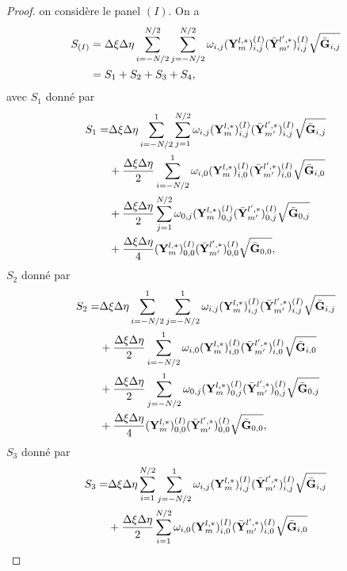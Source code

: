 \begin{proof}
on considère le panel $(I)$. On a
\begin{align*}
S_{(I)} & = \Delta \xi \Delta \eta \displaystyle\sum\limits_{i=-N/2}^{N/2} \displaystyle\sum\limits_{j=-N/2}^{N/2} \omega_{i,j} (\mathbf{Y}_m^{l,*})_{i,j}^{(I)} (\bar{\mathbf{Y}}_{m'}^{l',*})_{i,j}^{(I)} \sqrt{\bar{\mathbf{G}}_{i,j}} \\
	& = S_1 + S_2 + S_3 +S_4,
\end{align*}
avec $S_1$ donné par
\begin{align*}
S_1 = & \Delta \xi \Delta \eta \displaystyle\sum\limits_{i=-N/2}^{1} \displaystyle\sum\limits_{j=1}^{N/2} \omega_{i,j} (\mathbf{Y}_m^{l,*})_{i,j}^{(I)} (\bar{\mathbf{Y}}_{m'}^{l',*})_{i,j}^{(I)} \sqrt{\bar{\mathbf{G}}_{i,j}} \\
	& + \dfrac{\Delta \xi \Delta \eta}{2} \displaystyle\sum\limits_{i=-N/2}^{1} \omega_{i,0} (\mathbf{Y}_m^{l,*})_{i,0}^{(I)} (\bar{\mathbf{Y}}_{m'}^{l',*})_{i,0}^{(I)} \sqrt{\bar{\mathbf{G}}_{i,0}}\\
		& + \dfrac{\Delta \xi \Delta \eta}{2} \displaystyle\sum\limits_{j=1}^{N/2} \omega_{0,j} (\mathbf{Y}_m^{l,*})_{0,j}^{(I)} (\bar{\mathbf{Y}}_{m'}^{l',*})_{0,j}^{(I)} \sqrt{\bar{\mathbf{G}}_{0,j}}\\
		& + \dfrac{\Delta \xi \Delta \eta}{4} (\mathbf{Y}_m^{l,*})_{0,0}^{(I)} (\bar{\mathbf{Y}}_{m'}^{l',*})_{0,0}^{(I)} \sqrt{\bar{\mathbf{G}}_{0,0}},
\end{align*}
$S_2$ donné par
\begin{align*}
S_2 = & \Delta \xi \Delta \eta \displaystyle\sum\limits_{i=-N/2}^{1} \displaystyle\sum\limits_{j=-N/2}^{1} \omega_{i,j} (\mathbf{Y}_m^{l,*})_{i,j}^{(I)} (\bar{\mathbf{Y}}_{m'}^{l',*})_{i,j}^{(I)} \sqrt{\bar{\mathbf{G}}_{i,j}} \\
	& + \dfrac{\Delta \xi \Delta \eta}{2} \displaystyle\sum\limits_{i=-N/2}^{1} \omega_{i,0} (\mathbf{Y}_m^{l,*})_{i,0}^{(I)} (\bar{\mathbf{Y}}_{m'}^{l',*})_{i,0}^{(I)} \sqrt{\bar{\mathbf{G}}_{i,0}}\\
		& + \dfrac{\Delta \xi \Delta \eta}{2} \displaystyle\sum\limits_{j=-N/2}^{1} \omega_{0,j} (\mathbf{Y}_m^{l,*})_{0,j}^{(I)} (\bar{\mathbf{Y}}_{m'}^{l',*})_{0,j}^{(I)} \sqrt{\bar{\mathbf{G}}_{0,j}}\\
		& + \dfrac{\Delta \xi \Delta \eta}{4} (\mathbf{Y}_m^{l,*})_{0,0}^{(I)} (\bar{\mathbf{Y}}_{m'}^{l',*})_{0,0}^{(I)} \sqrt{\bar{\mathbf{G}}_{0,0}},
\end{align*}
$S_3$ donné par
\begin{align*}
S_3 = & \Delta \xi \Delta \eta \gsum_{i=1}^{N/2} \gsum_{j=-N/2}^{1} \omega_{i,j} (\mathbf{Y}_m^{l,*})_{i,j}^{(I)} (\bar{\mathbf{Y}}_{m'}^{l',*})_{i,j}^{(I)} \sqrt{\bar{\mathbf{G}}_{i,j}} \\
	& + \dfrac{\Delta \xi \Delta \eta}{2} \gsum_{i=1}^{N/2} \omega_{i,0} (\mathbf{Y}_m^{l,*})_{i,0}^{(I)} (\bar{\mathbf{Y}}_{m'}^{l',*})_{i,0}^{(I)} \sqrt{\bar{\mathbf{G}}_{i,0}}\\

\end{align*}
\end{proof}
